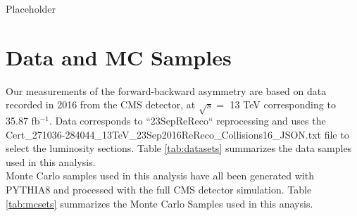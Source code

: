 \documentclass[
10pt, %
a4paper, %
oneside, %
headinclude,footinclude, %
BCOR5mm, %
]{scrartcl}
\begin{document}
Placeholder

 

\section{Data and MC Samples}

Our measurements of the forward-backward asymmetry are based on data recorded in 2016 from the CMS detector, at $\sqrt{s} =$ 13 TeV
corresponding to 35.87 fb$^{-1}$. Data corresponds to ``23SepReReco`` reprocessing and uses the
{\small Cert\_271036-284044\_13TeV\_23Sep2016ReReco\_Collisions16\_JSON.txt} file to select the luminosity sections.
Table \ref{tab:datasets} summarizes the data samples used in this analysis.\\

Monte Carlo samples used in this analysis have all been generated with PYTHIA8 and processed with the full CMS detector simulation.
Table \ref{tab:mcsets} summarizes the Monte Carlo Samples used in this anaysis.\\
\end{document}
